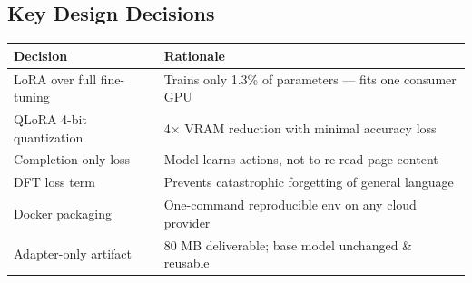 \subsection{Key Design Decisions}
\begin{frame}{\insertsubsection}
  \small
  \begin{tabular}{p{} p{}}
    \textbf{Decision}              & \textbf{Rationale}                                    \\
    \hline
    LoRA over full fine-tuning     & Trains only 1.3\% of parameters --- fits one consumer GPU \\
    QLoRA 4-bit quantization       & 4$\times$ VRAM reduction with minimal accuracy loss   \\
    Completion-only loss           & Model learns actions, not to re-read page content     \\
    DFT loss term                  & Prevents catastrophic forgetting of general language  \\
    Docker packaging               & One-command reproducible env on any cloud provider    \\
    Adapter-only artifact          & 80 MB deliverable; base model unchanged \& reusable   \\
  \end{tabular}
\end{frame}
